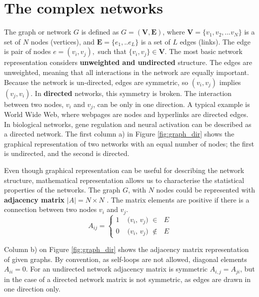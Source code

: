\section{The complex networks}

The graph or network $G$ is defined as $G=(\boldsymbol{V}, \boldsymbol{E})$, where $\boldsymbol{V} = \{ v_1, v_2, ... v_N\}$ is a set of $N$ nodes (vertices), and  $\boldsymbol{E} = \{e_1, .. e_L\}$ is a set of $L$ edges (links). The edge is pair of nodes $e = (v_i, v_j), $ such that $\{v_i,v_j\}\in \boldsymbol{V}$. The most basic network representation considers \textbf{unweighted and undirected} structure. The edges are unweighted, meaning that all interactions in the network are equally important. Because the network is un-directed, edges are symmetric, so $(v_i, v_j)$ implies $(v_j, v_i)$. In \textbf{directed} networks, this symmetry is broken. The interaction between two nodes, $v_i$ and $v_j$, can be only in one direction. A typical example is World Wide Web, where webpages are nodes and hyperlinks are directed edges. In biological networks, gene regulation and neural activation can be described as a directed network. The first column a) in Figure \ref{fig:graph_dir} shows the graphical representation of two networks with an equal number of nodes; the first is undirected, and the second is directed. 

Even though graphical representation can be useful for describing the network structure, mathematical representation allows us to characterise the statistical properties of the networks. The graph $G$, with $N$ nodes could be represented with \textbf{adjacency matrix} $|A| = N \times N$ \cite{boccaletti2006complex}. The matrix elements are positive if there is a connection between two nodes $v_i$ and $v_j$. 
\begin{equation}
A_{ij} =
\begin{cases}
1 & \text{ ($v_i$, $v_j$) $\in$ $E$}\\
0 & \text{ ($v_i$, $v_j$) $\notin$ $E$}
\end{cases}       
\end{equation}

Column b) on Figure \ref{fig:graph_dir} shows the adjacency matrix representation of given graphs. By convention, as self-loops are not allowed, diagonal elements $A_{ii}=0$. For an undirected network adjacency matrix is symmetric $A_{i,j}=A_{ji}$, but in the case of a directed network matrix is not symmetric, as edges are drawn in one direction only.  

